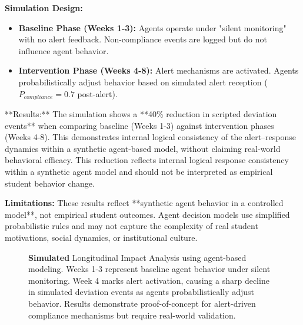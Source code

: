 \documentclass[conference]{IEEEtran}
\begin{document}
\textbf{Simulation Design:}
\begin{itemize}
    \item \textbf{Baseline Phase (Weeks 1-3):} Agents operate under "silent monitoring" with no alert feedback. Non-compliance events are logged but do not influence agent behavior.
    \item \textbf{Intervention Phase (Weeks 4-8):} Alert mechanisms are activated. Agents probabilistically adjust behavior based on simulated alert reception ($P_{compliance} = 0.7$ post-alert).
\end{itemize}

**Results:** The simulation shows a **40\% reduction in scripted deviation events** when comparing baseline (Weeks 1-3) against intervention phases (Weeks 4-8). This demonstrates internal logical consistency of the alert–response dynamics within a synthetic agent-based model, without claiming real-world behavioral efficacy. This reduction reflects internal logical response consistency within a synthetic agent model and should not be interpreted as empirical student behavior change.

\textbf{Limitations:} These results reflect **synthetic agent behavior in a controlled model**, not empirical student outcomes. Agent decision models use simplified probabilistic rules and may not capture the complexity of real student motivations, social dynamics, or institutional culture.



\begin{figure}[H]
\centering
{}

\caption{\textbf{Simulated} Longitudinal Impact Analysis using agent-based modeling. Weeks 1-3 represent baseline agent behavior under silent monitoring. Week 4 marks alert activation, causing a sharp decline in simulated deviation events as agents probabilistically adjust behavior. Results demonstrate proof-of-concept for alert-driven compliance mechanisms but require real-world validation.}
\label{fig:trend}
\end{figure}
\end{document}

